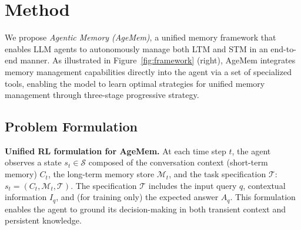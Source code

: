 \section{Method}

We propose \textit{Agentic Memory (AgeMem)}, a unified memory framework that enables LLM agents to autonomously manage both LTM and STM in an end-to-end manner. 
As illustrated in Figure~\ref{fig:framework} (right), AgeMem integrates memory management capabilities directly into the agent via a set of specialized tools, enabling the model to learn optimal strategies for unified memory management through three-stage progressive strategy.

\subsection{Problem Formulation}
\label{sec:problem_formu}


\textbf{Unified RL formulation for AgeMem.} At each time step $t$, the agent observes a state $s_t \in \mathcal{S}$ composed of the conversation context (short-term memory) $C_t$, the long-term memory store $\mathcal{M}_t$, and the task specification $\mathcal{T}$: $s_t = (C_t, \mathcal{M}_t, \mathcal{T})$.
The specification $\mathcal{T}$ includes the input query $q$, contextual information $I_q$, and (for training only) the expected answer $A_q$. This formulation enables the agent to ground its decision-making in both transient context and persistent knowledge.

